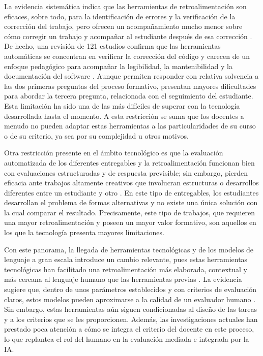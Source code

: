 \documentclass[letterpaper, 10 pt, conference]{ieeeconf}
\begin{document}
La evidencia sistemática indica que las herramientas de retroalimentación son eficaces, sobre todo, para la identificación de errores y la verificación de la corrección del trabajo, pero ofrecen un acompañamiento mucho menor sobre cómo corregir un trabajo y acompañar al estudiante después de esa corrección \cite{10}. De hecho, una revisión de 121 estudios confirma que las herramientas automáticas se concentran en verificar la corrección del código y carecen de un enfoque pedagógico para acompañar la legibilidad, la mantenibilidad y la documentación del software \cite{11}. Aunque permiten responder con relativa solvencia a las dos primeras preguntas del proceso formativo, presentan mayores dificultades para abordar la tercera pregunta, relacionada con el seguimiento del estudiante. Esta limitación ha sido una de las más difíciles de superar con la tecnología desarrollada hasta el momento. A esta restricción se suma que los docentes a menudo no pueden adaptar estas herramientas a las particularidades de su curso o de su criterio, ya sea por su complejidad u otros motivos. 

Otra restricción presente en el ámbito tecnológico es que la evaluación automatizada de los diferentes entregables y la retroalimentación funcionan bien con evaluaciones estructuradas y de respuesta previsible; sin embargo, pierden eficacia ante trabajos altamente creativos que involucran estructuras o desarrollos diferentes entre un estudiante y otro \cite{11}. En este tipo de entregables, los estudiantes desarrollan el problema de formas alternativas y no existe una única solución con la cual comparar el resultado. Precisamente, este tipo de trabajos, que requieren una mayor retroalimentación y poseen un mayor valor formativo, son aquellos en los que la tecnología presenta mayores limitaciones. 

Con este panorama, la llegada de herramientas tecnológicas y de los modelos de lenguaje a gran escala introduce un cambio relevante, pues estas herramientas tecnológicas han facilitado una retroalimentación más elaborada, contextual y más cercana al lenguaje humano que las herramientas previas \cite{12}. La evidencia sugiere que, dentro de unos parámetros establecidos y con criterios de evaluación claros, estos modelos pueden aproximarse a la calidad de un evaluador humano \cite{12}. Sin embargo, estas herramientas aún siguen condicionadas al diseño de las tareas y a los criterios que se les proporcionen. Además, las investigaciones actuales han prestado poca atención a cómo se integra el criterio del docente en este proceso, lo que replantea el rol del humano en la evaluación mediada e integrada por la IA. 
\end{document}
